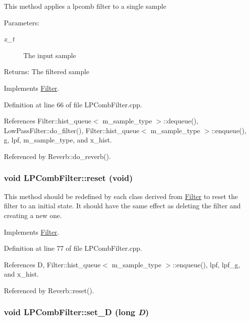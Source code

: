 This method applies a lpcomb filter to a single sample \begin{Desc}
\item[Parameters:]
\begin{description}
\item[{\em x\_\-t}]The input sample \end{description}
\end{Desc}
\begin{Desc}
\item[Returns:]The filtered sample \end{Desc}


Implements \hyperlink{classFilter_a3}{Filter}.

Definition at line 66 of file LPComb\-Filter.cpp.

References Filter::hist\_\-queue$<$ m\_\-sample\_\-type $>$::dequeue(), Low\-Pass\-Filter::do\_\-filter(), Filter::hist\_\-queue$<$ m\_\-sample\_\-type $>$::enqueue(), g, lpf, m\_\-sample\_\-type, and x\_\-hist.

Referenced by Reverb::do\_\-reverb().\hypertarget{classLPCombFilter_a3}{
\subsubsection[reset]{\setlength{\rightskip}{0pt plus 5cm}void LPComb\-Filter::reset (void)}}
\label{classLPCombFilter_a3}


This method should be redefined by each class derived from \hyperlink{classFilter}{Filter} to reset the filter to an initial state. It should have the same effect as deleting the filter and creating a new one. 

Implements \hyperlink{classFilter_a4}{Filter}.

Definition at line 77 of file LPComb\-Filter.cpp.

References D, Filter::hist\_\-queue$<$ m\_\-sample\_\-type $>$::enqueue(), lpf, lpf\_\-g, and x\_\-hist.

Referenced by Reverb::reset().\hypertarget{classLPCombFilter_a7}{
\subsubsection[set\_\-D]{\setlength{\rightskip}{0pt plus 5cm}void LPComb\-Filter::set\_\-D (long {\em D})}}
\label{classLPCombFilter_a7}


